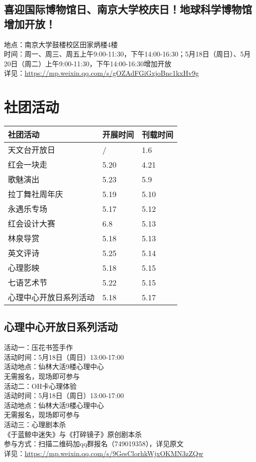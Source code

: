 \documentclass[letterpaper, 12pt]{article}
\begin{document}
\begin{multicols}{2}
\begin{tabular}{|>{\centering\arraybackslash}m{}|m{}|m{}|}
    \hline
\end{tabular}
\subsection{喜迎国际博物馆日、南京大学校庆日！地球科学博物馆增加开放！} %
地点：南京大学鼓楼校区田家炳楼4楼
\\时间：周一、周三、周五上午9:00-11:30，下午14:00-16:30；5月18日（周日）、5月20日（周二）上午9:00-11:30，下午14:00-16:30增加开放
\\详见：\url{https://mp.weixin.qq.com/s/gOZAdFGiGxjoBnc1kxHv9g}


\section{社团活动}
\begin{tabular}{|>{\centering\arraybackslash}m{}|m{}|m{}|}
    \hline
    社团活动 & 开展时间 & 刊载时间\\
    \hline\hline
    天文台开放日 & / & 1.6\\
    红会一块走 & 5.20 & 4.21\\
    歌魅演出 & 5.23 & 5.9\\
    拉丁舞社周年庆 & 5.19 & 5.10\\
    永遇乐专场 & 5.17 & 5.12\\
    红会设计大赛 & 6.8 & 5.13\\
    林泉导赏 & 5.18 & 5.13\\
    英文评诗 & 5.25 & 5.14\\
    心理影映 & 5.18 & 5.15\\
    七语艺术节 & 5.22 & 5.15\\
    心理中心开放日系列活动 & 5.18 & 5.17\\
    \hline
\end{tabular}

\subsection{心理中心开放日系列活动} %
活动一：压花书签手作
\\活动时间：5月18日（周日）13:00-17:00 
\\活动地点：仙林大活9楼心理中心
\\无需报名，现场即可参与
\\活动二：OH卡心理体验
\\活动时间：5月18日（周日）13:00-17:00 
\\活动地点：仙林大活9楼心理中心
\\无需报名，现场即可参与
\\活动三：心理剧本杀
\\《于蓝鲸中迷失》与《打碎镜子》原创剧本杀
\\参与方式：扫描二维码加qq群报名（749019358），详见原文
\\详见：\url{https://mp.weixin.qq.com/s/9GesClorhkWjxOKMN3zZQw}



\end{multicols}
\end{document}
